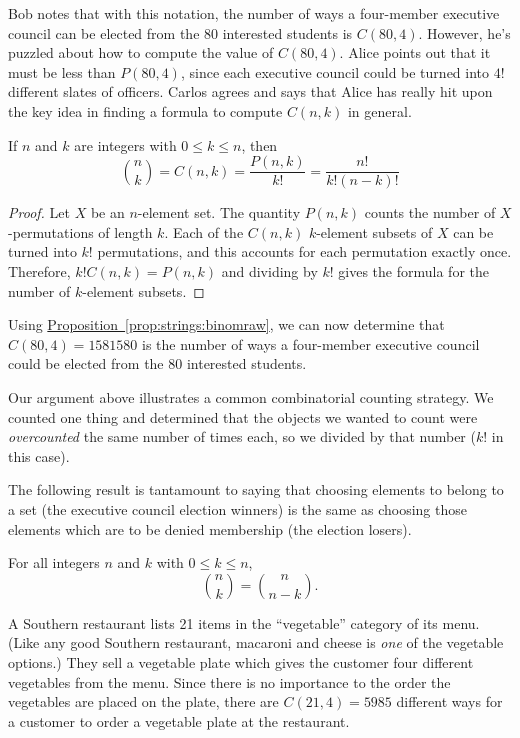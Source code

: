 Bob notes that with this notation, the number of ways a four-member
executive council can be elected from the $80$ interested students is
$C(80,4)$. However, he's puzzled about how to compute the value of
$C(80,4)$. Alice points out that it must be less than $P(80,4)$, since
each executive council could be turned into $4!$ different slates of
officers. Carlos agrees and says that Alice has really hit upon the
key idea in finding a formula to compute $C(n,k)$ in general.

\begin{proposition}\label{prop:strings:binomraw}
If $n$ and $k$ are integers with $0\le k\le n$, then
\begin{equation*}
\binom{n}{k}=C(n,k)=\frac{P(n,k)}{k!}=\frac{n!}{k!(n-k)!}
\end{equation*}
\end{proposition}

\begin{proof}
  Let $X$ be an $n$-element set.  The quantity $P(n,k)$ counts the
  number of $X$-permutations of length $k$. Each of the $C(n,k)$
  $k$-element subsets of $X$ can be turned into $k!$ permutations, and
  this accounts for each permutation exactly once. Therefore, $k!
  C(n,k)=P(n,k)$ and dividing by $k!$ gives the formula for the number
  of $k$-element subsets.
\end{proof}

Using
\hyperref[prop:strings:binomraw]{Proposition~\ref*{prop:strings:binomraw}},
we can now determine that $C(80,4)=1581580$ is the number of ways a
four-member executive council could be elected from the $80$
interested students.

Our argument above illustrates a common combinatorial counting
strategy. We counted one thing and determined that the objects we
wanted to count were \emph{overcounted} the same number of times each,
so we divided by that number ($k!$ in this case). 

The following result is tantamount to saying that choosing elements to
belong to a set (the executive council election winners) is the same
as choosing those elements which are to be denied membership (the
election losers).

\begin{proposition}\label{prop:strings:symmetric}
For all integers $n$ and $k$ with $0\le k\le n$,
\[
\binom{n}{k}=\binom{n}{n-k}.
\]
\end{proposition}

\begin{example}
  A Southern restaurant lists 21 items in the ``vegetable'' category
  of its menu. (Like any good Southern restaurant, macaroni and cheese
  is \textit{one} of the vegetable options.) They sell a vegetable plate which
  gives the customer four different vegetables from the menu. Since
  there is no importance to the order the vegetables are placed on the
  plate, there are $C(21,4)=5985$ different ways for a customer to
  order a vegetable plate at the restaurant.
\end{example}

